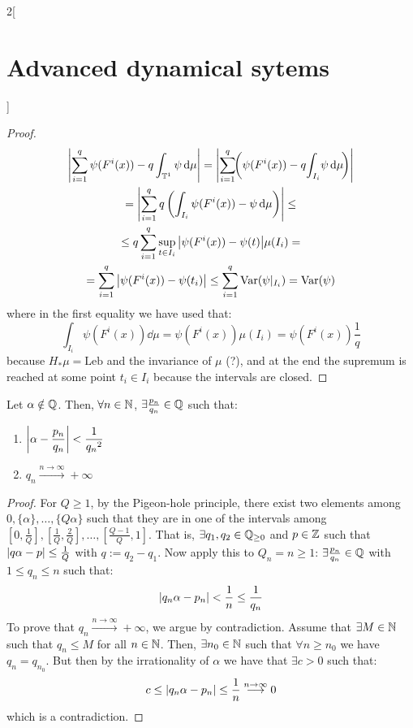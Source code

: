 \documentclass[../../../main_math.tex]{subfiles}
\begin{document}
\begin{multicols}{2}[\section{Advanced dynamical sytems}]
\begin{proof}
\begin{multline*}
      \abs{\sum_{i=1}^q \psi(F^i(x))-q\int_{\mathbb{T}^1}\psi\dd{\mu}}=\abs{\sum_{i=1}^q\!\! \left(\psi(F^i(x))-q\!\int_{I_i}\! \psi\dd{\mu}\!\right)}\\=\abs{\sum_{i=1}^q q\left(\int_{I_i}\psi(F^i(x))-\psi \dd{\mu}\right)}\leq\\\leq q \sum_{i=1}^q \sup_{t\in I_i}\abs{\psi(F^i(x))-\psi(t)}\mu(I_i)=\\=\sum_{i=1}^q \abs{\psi(F^i(x))-\psi(t_i)}\leq \sum_{i=1}^q \mathrm{Var}(\psi|_{I_i})= \mathrm{Var}(\psi)
    \end{multline*}
    where in the first equality we have used that:
    $$
      \int_{I_i}\psi(F^i(x))\dd{\mu}=\psi(F^i(x))\mu(I_i)=\psi(F^i(x))\frac{1}{q}
    $$
    because $H_*\mu = \text{Leb}$ and the invariance of $\mu$ (?), and at the end the supremum is reached at some point $t_i\in I_i$ because the intervals are closed.
  \end{proof}
  \begin{lemma}\label{ADS:lema_pnqn}
    Let $\alpha\notin\mathbb{Q}$. Then, $\forall n\in\mathbb{N}$, $\exists \frac{p_n}{q_n}\in\mathbb{Q}$ such that:
    \begin{enumerate}
      \item $\displaystyle\abs{\alpha-\frac{p_n}{q_n}}<\frac{1}{{q_n}^2}$
      \item $q_n\overset{n\to\infty}{\longrightarrow}+\infty$
    \end{enumerate}
  \end{lemma}
  \begin{proof}
    For $Q\geq 1$, by the Pigeon-hole principle, there exist two elements among $0,\{\alpha\},\ldots,\{Q \alpha\}$ such that they are in one of the intervals among $[0,\frac{1}{Q}], [\frac{1}{Q},\frac{2}{Q}],\ldots,[\frac{Q-1}{Q},1]$. That is, $\exists q_1,q_2\in\mathbb{Q}_{\geq 0}$ and $p\in\mathbb{Z}$ such that $\abs{q\alpha -p}\leq \frac{1}{Q}$ with $q:=q_2-q_1$. Now apply this to $Q_n=n\geq 1$: $\exists \frac{p_n}{q_n}\in \mathbb{Q}$ with $1\leq q_n\leq n$ such that:
    $$
      \abs{q_n\alpha-p_n}<\frac{1}{n}\leq \frac{1}{q_n}
    $$
    To prove that $q_n\overset{n\to\infty}{\longrightarrow}+\infty$, we argue by contradiction. Assume that $\exists M\in\mathbb{N}$ such that $q_n\leq M$ for all $n\in\mathbb{N}$. Then, $\exists n_0\in\mathbb{N}$ such that $\forall n\geq n_0$ we have $q_n=q_{n_0}$. But then by the irrationality of $\alpha$ we have that $\exists c>0$ such that:
    $$
      c\leq \abs{q_n\alpha-p_n}\leq \frac{1}{n} \overset{n\to\infty}{\longrightarrow} 0
    $$
    which is a contradiction.
  \end{proof}
  \begin{lemma}\label{ADS:lema_var_log}

\end{lemma}
\end{multicols}
\end{document}
